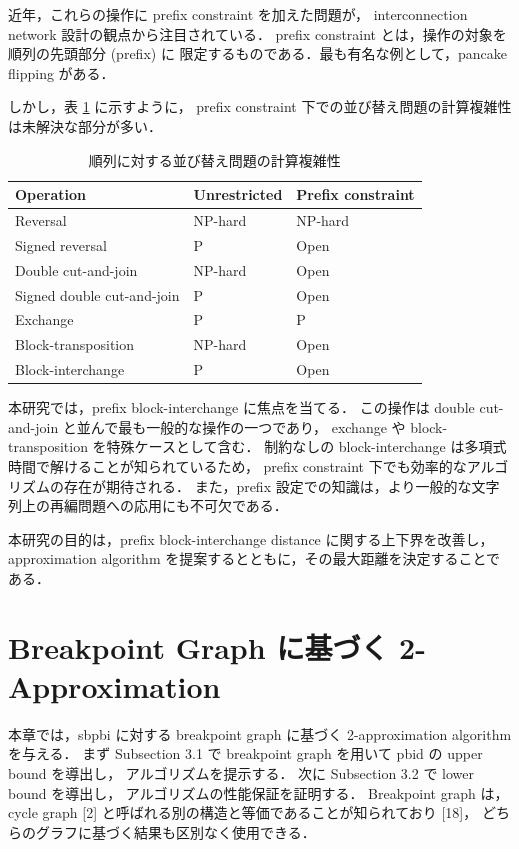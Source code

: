 \documentclass[paper=a4,fontsize=11pt,report,oneside]{jlreq}
\begin{document}
近年，これらの操作に prefix constraint を加えた問題が，
interconnection network 設計の観点から注目されている．
prefix constraint とは，操作の対象を順列の先頭部分 (prefix) に
限定するものである．最も有名な例として，pancake flipping がある．

しかし，表 \ref{tab:complexity} に示すように，
prefix constraint 下での並び替え問題の計算複雑性は未解決な部分が多い．

\begin{table}[H]
    \centering
    \caption{順列に対する並び替え問題の計算複雑性}
    \label{tab:complexity}
    \begin{tabular}{|l|l|l|}
    \hline
    Operation & Unrestricted & Prefix constraint \\ \hline
    Reversal & NP-hard & NP-hard \\
    Signed reversal & P & Open \\
    Double cut-and-join & NP-hard & Open \\
    Signed double cut-and-join & P & Open \\
    Exchange & P & P \\
    Block-transposition & NP-hard & Open \\
    Block-interchange & P & Open \\ \hline
    \end{tabular}
\end{table}

本研究では，prefix block-interchange に焦点を当てる．
この操作は double cut-and-join と並んで最も一般的な操作の一つであり，
exchange や block-transposition を特殊ケースとして含む．
制約なしの block-interchange は多項式時間で解けることが知られているため，
prefix constraint 下でも効率的なアルゴリズムの存在が期待される．
また，prefix 設定での知識は，より一般的な文字列上の再編問題への応用にも不可欠である．

本研究の目的は，prefix block-interchange distance に関する上下界を改善し，
approximation algorithm を提案するとともに，その最大距離を決定することである．

\chapter{Breakpoint Graph に基づく 2-Approximation}

本章では，sbpbi に対する breakpoint graph に基づく 2-approximation algorithm を与える．
まず Subsection 3.1 で breakpoint graph を用いて pbid の upper bound を導出し，
アルゴリズムを提示する．
次に Subsection 3.2 で lower bound を導出し，
アルゴリズムの性能保証を証明する．
Breakpoint graph は，cycle graph [2] と呼ばれる別の構造と等価であることが知られており [18]，
どちらのグラフに基づく結果も区別なく使用できる．
\end{document}
